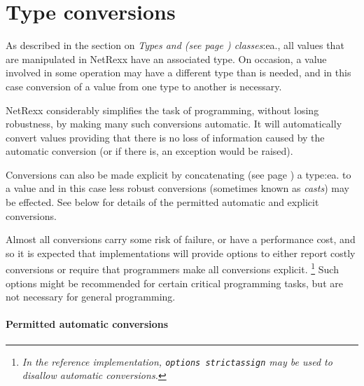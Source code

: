\chapter{Type conversions}\label{"id"}
 
As described in the section on  \emph{Types and (see page \pageref{reftypes}) 
classes}:ea., all values that are manipulated in NetRexx have an
associated type.  On occasion, a value involved in some operation may
have a different type than is needed, and in this case conversion of
a value from one type to another is necessary.
 
NetRexx considerably simplifies the task of programming, without losing
robustness, by making many such conversions automatic.  It will
automatically convert values providing that there is no loss of
information caused by the automatic conversion (or if there is, an
exception would be raised).
 
\index{,}
Conversions can also be made explicit by  concatenating (see page \pageref{reftypeops}) 
a type:ea. to a value and in this case less robust conversions
(sometimes known as \emph{casts}) may be effected.
See below for details of the permitted automatic and explicit
conversions.
 
Almost all conversions carry some risk of failure, or have a performance
cost, and so it is expected that implementations will provide options to
either report costly conversions or require that programmers make all
conversions explicit.
\footnote{
\emph{In the reference implementation, \texttt{options strictassign} may be
used to disallow automatic conversions.}
}
Such options might be recommended for certain critical programming
tasks, but are not necessary for general programming.
\subsubsection{Permitted automatic conversions}
 
